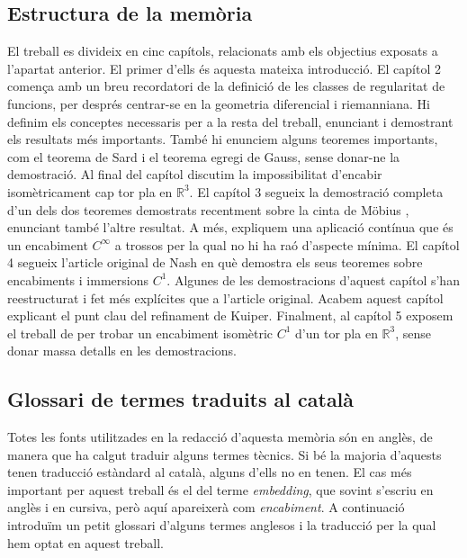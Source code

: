 \subsection*{Estructura de la mem\`oria}
El treball es divideix en cinc capítols, relacionats amb els objectius exposats a l'apartat anterior. El primer d'ells és aquesta mateixa introducció. El capítol 2 comença amb un breu recordatori de la definició de les classes de regularitat de funcions, per després centrar-se en la geometria diferencial i riemanniana. Hi definim els conceptes necessaris per a la resta del treball, enunciant i demostrant els resultats més importants. També hi enunciem alguns teoremes importants, com el teorema de Sard i el teorema egregi de Gauss, sense donar-ne la demostració. Al final del capítol discutim la impossibilitat d'encabir isomètricament cap tor pla en $\mathbb R^3$. El capítol 3 segueix la demostració completa d'un dels dos teoremes demostrats recentment sobre la cinta de Möbius \cite{schwartz2024}, enunciant també l'altre resultat. A més, expliquem una aplicació contínua que és un encabiment $C^\infty$ a trossos per la qual no hi ha raó d'aspecte mínima. El capítol 4 segueix l'article original de Nash en què demostra els seus teoremes sobre encabiments i immersions $C^1$. Algunes de les demostracions d'aquest capítol s'han reestructurat i fet més explícites que a l'article original. Acabem aquest capítol explicant el punt clau del refinament de Kuiper. Finalment, al capítol 5 exposem el treball de \citet{borrelli2013} per trobar un encabiment isomètric $C^1$ d'un tor pla en $\mathbb R^3$, sense donar massa detalls en les demostracions. 
\subsection*{Glossari de termes traduits al català}
Totes les fonts utilitzades en la redacció d'aquesta memòria són en anglès, de manera que ha calgut traduir alguns termes tècnics. Si bé la majoria d'aquests tenen traducció estàndard al català, alguns d'ells no en tenen. El cas més important per aquest treball és el del terme \textit{embedding}, que sovint s'escriu en anglès i en cursiva, però aquí apareixerà com \textit{encabiment}. A continuació introduïm un petit glossari d'alguns termes anglesos i la traducció per la qual hem optat en aquest treball. 

